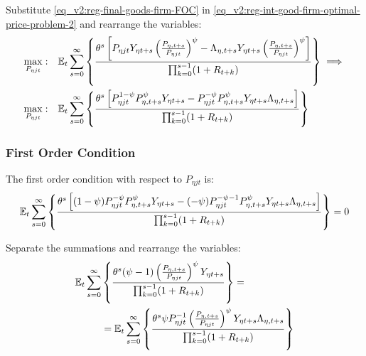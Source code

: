 \documentclass[../thesis.tex]{subfiles}
\begin{document}
Substitute \ref{eq_v2:reg-final-goods-firm-FOC} in \ref{eq_v2:reg-int-good-firm-optimal-price-problem-2} and rearrange the variables:
\begin{align}
	\max_{P_{\eta jt}}: & \quad {\mathbb{E}_{t}} \sum_{s=0}^{\infty} \left\{ \frac{\theta^s \left[ P_{\eta jt} Y_{\eta t+s} \left( \frac{P_{\eta, t+s}}{P_{\eta jt}} \right)^{\psi} - \Lambda_{\eta, t+s} Y_{\eta t+s} \left( \frac{P_{\eta, t+s}}{P_{\eta jt}} \right)^{\psi} \right]}{\prod_{k=0}^{s-1}(1+R_{t+k})} \right\} \implies \nonumber 
	\\
	\max_{P_{\eta jt}}: & \quad {\mathbb{E}_{t}} \sum_{s=0}^{\infty} \left\{ \frac{\theta^s \left[ P_{\eta jt}^{1-\psi} P_{\eta, t+s}^{\psi} Y_{\eta t+s} - P_{\eta jt}^{-\psi} P_{\eta, t+s}^{\psi} Y_{\eta t+s} \Lambda_{\eta, t+s} \right]}{\prod_{k=0}^{s-1}(1+R_{t+k})} \right\} \nonumber
\end{align}


\subsubsection*{First Order Condition}

The first order condition with respect to $P_{\eta jt}$ is:
\begin{align}
	& \quad {\mathbb{E}_{t}} \sum_{s=0}^{\infty} \left\{ \frac{\theta^s \left[ (1-\psi) P_{\eta jt}^{-\psi} P_{\eta, t+s}^{\psi} Y_{\eta t+s} - (-\psi) P_{\eta jt}^{-\psi-1} P_{\eta, t+s}^{\psi} Y_{\eta t+s} \Lambda_{\eta, t+s} \right]}{\prod_{k=0}^{s-1}(1+R_{t+k})} \right\} = 0 \nonumber
\end{align}


Separate the summations and rearrange the variables:
\begin{align}
	\begin{split}
		{\mathbb{E}_{t}} \sum_{s=0}^{\infty} &\left\{ \frac{\theta^s (\psi-1) \left( \frac{P_{\eta, t+s}} {P_{\eta jt}} \right)^{\psi} Y_{\eta t+s}} {\prod_{k=0}^{s-1} (1+R_{t+k})} \right\} = \\
		&= {\mathbb{E}_{t}} \sum_{s=0}^{\infty} \left\{ \frac{\theta^s \psi P_{\eta jt}^{-1} \left( \frac{P_{\eta, t+s}} {P_{\eta jt}} \right)^{\psi} Y_{\eta t+s} \Lambda_{\eta, t+s}}{\prod_{k=0}^{s-1}(1+R_{t+k})} \right\} \label{eq_v2:reg-int-good-firm-optimal-price-FOC}
	\end{split}
\end{align}

\end{document}
